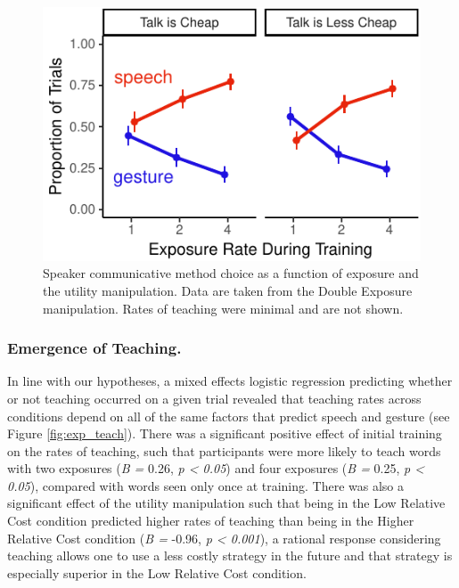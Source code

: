 \documentclass[10pt, letterpaper]{article}
\newenvironment{CodeChunk}{}{}
\begin{document}
\begin{CodeChunk}
\begin{figure}[tb]

{\centering \includegraphics{figs/exp_speech_gesture-1} 

}

\caption[Speaker communicative method choice as a function of exposure and the utility manipulation]{Speaker communicative method choice as a function of exposure and the utility manipulation. Data are taken from the Double Exposure manipulation. Rates of teaching were minimal and are not shown.}\label{fig:exp_speech_gesture}
\end{figure}
\end{CodeChunk}

\subsubsection{Emergence of Teaching.}\label{emergence-of-teaching.}

In line with our hypotheses, a mixed effects logistic regression
predicting whether or not teaching occurred on a given trial revealed
that teaching rates across conditions depend on all of the same factors
that predict speech and gesture (see Figure \ref{fig:exp_teach}). There
was a significant positive effect of initial training on the rates of
teaching, such that participants were more likely to teach words with
two exposures (\emph{B =} 0.26, \emph{p \textless{} 0.05}) and four
exposures (\emph{B =} 0.25, \emph{p \textless{} 0.05}), compared with
words seen only once at training. There was also a significant effect of
the utility manipulation such that being in the Low Relative Cost
condition predicted higher rates of teaching than being in the Higher
Relative Cost condition (\emph{B =} -0.96, \emph{p \textless{} 0.001}),
a rational response considering teaching allows one to use a less costly
strategy in the future and that strategy is especially superior in the
Low Relative Cost condition.
\end{document}
